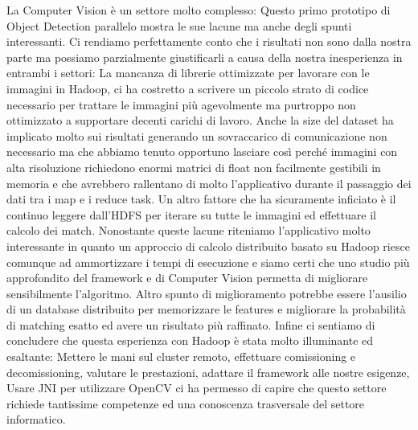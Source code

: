 La Computer Vision è un settore molto complesso: Questo primo prototipo di Object Detection parallelo mostra le sue lacune ma anche degli spunti interessanti. Ci rendiamo perfettamente conto che i risultati non sono dalla nostra parte ma possiamo parzialmente giustificarli a causa della nostra inesperienza in entrambi i settori: La mancanza di librerie ottimizzate per lavorare con le immagini in Hadoop, ci ha costretto a scrivere un piccolo strato di codice necessario per trattare le immagini più agevolmente ma purtroppo non ottimizzato a supportare decenti carichi di lavoro. Anche la size del dataset ha implicato molto sui risultati generando un sovraccarico di comunicazione non necessario ma che abbiamo tenuto opportuno lasciare così perché immagini con alta risoluzione richiedono enormi matrici di float non facilmente gestibili in memoria e che avrebbero rallentano di molto l'applicativo durante il passaggio dei dati tra i map e i reduce task. Un altro fattore che ha sicuramente inficiato è il continuo leggere dall'HDFS per iterare su tutte le immagini ed effettuare il calcolo dei match. Nonostante queste lacune riteniamo l'applicativo molto interessante in quanto un approccio di calcolo distribuito basato su Hadoop riesce comunque ad ammortizzare i tempi di esecuzione e siamo certi che uno studio più approfondito del framework e di Computer Vision permetta di migliorare sensibilmente l'algoritmo. Altro spunto di miglioramento potrebbe essere l'ausilio di un database distribuito per memorizzare le features e migliorare la probabilità di matching esatto ed avere un risultato più raffinato. Infine ci sentiamo di concludere che questa esperienza con Hadoop è stata molto illuminante ed esaltante: Mettere le mani sul cluster remoto, effettuare comissioning e decomissioning, valutare le prestazioni, adattare il framework alle nostre esigenze, Usare JNI per utilizzare OpenCV ci ha permesso di capire che questo settore richiede tantissime competenze ed una conoscenza trasversale del settore informatico. 